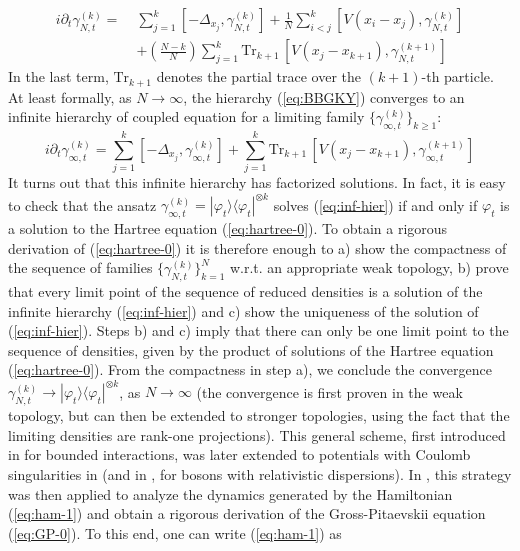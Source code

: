 \documentclass[11pt,a4paper]{article}
\newcommand{\tr}{\mbox{Tr}}
\begin{document}
\begin{equation}\label{eq:BBGKY} \begin{split}
i\partial_t \gamma^{(k)}_{N,t} = \; & \sum_{j=1}^k \left[-\Delta_{x_j} , \gamma^{(k)}_{N,t} \right]  + \frac{1}{N} \sum_{i<j}^k \left[ V(x_i - x_j) , \gamma^{(k)}_{N,t} \right] \\ &+\left( \frac{N-k}{N} \right) \sum_{j=1}^k \tr_{k+1} \, \left[ V(x_j - x_{k+1}) , \gamma^{(k+1)}_{N,t} \right] 
\end{split}\end{equation}
In the last term, $\tr_{k+1}$ denotes the partial trace over the $(k+1)$-th particle. At least formally, as $N \to \infty$, the hierarchy (\ref{eq:BBGKY}) converges to an infinite hierarchy of coupled equation for a limiting family $\{ \gamma_{\infty,t}^{(k)} \}_{k \geq 1}$:
\begin{equation}
\label{eq:inf-hier}
i\partial_t \gamma^{(k)}_{\infty,t} =  \sum_{j=1}^k \left[-\Delta_{x_j} , \gamma^{(k)}_{\infty,t} \right]  + \sum_{j=1}^k \tr_{k+1} \, \left[ V(x_j - x_{k+1}) , \gamma^{(k+1)}_{\infty,t} \right] 
\end{equation}
It turns out that this infinite hierarchy has factorized solutions. In fact, it is easy to check that the ansatz $\gamma^{(k)}_{\infty,t} = |\varphi_t \rangle \langle \varphi_t|^{\otimes k}$ solves (\ref{eq:inf-hier}) if and only if $\varphi_t$ is a solution to the Hartree equation (\ref{eq:hartree-0}). To obtain a rigorous derivation of (\ref{eq:hartree-0}) it is therefore enough to a) show the compactness of the sequence of families $\{ \gamma_{N,t}^{(k)} \}_{k=1}^N$ w.r.t. an appropriate weak topology, b) prove that every limit point of the sequence of reduced densities is a solution of the infinite hierarchy (\ref{eq:inf-hier}) and c) show the uniqueness of the solution of (\ref{eq:inf-hier}). Steps b) and c) imply that there can only be one limit point to the sequence of densities, given by the product of solutions of the Hartree equation (\ref{eq:hartree-0}). {F}rom the compactness in step a), we conclude the convergence $\gamma^{(k)}_{N,t} \to |\varphi_t \rangle \langle \varphi_t|^{\otimes k}$, as $N \to \infty$ (the convergence is first proven in the weak topology, but can then be extended to stronger topologies, using the fact that the limiting densities are rank-one projections). This general scheme, first introduced in \cite{S} for bounded interactions, was later extended to potentials with Coulomb singularities in \cite{EY} (and in \cite{ES}, for bosons with relativistic dispersions). In \cite{ESY1,ESY2,ESY3,ESY4}, this strategy was then applied to analyze the dynamics generated by the Hamiltonian (\ref{eq:ham-1}) and obtain a rigorous derivation of the Gross-Pitaevskii equation (\ref{eq:GP-0}). To this end, one can write (\ref{eq:ham-1}) as
\end{document}
